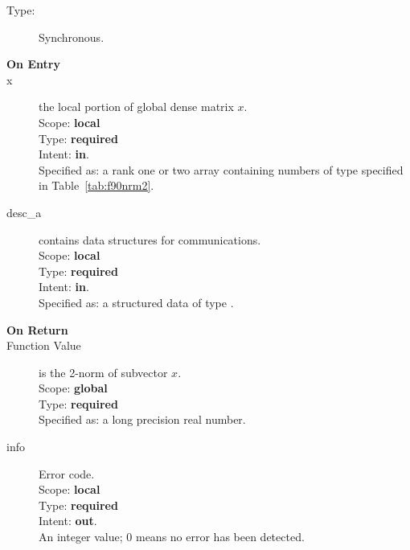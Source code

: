 \begin{description}
\item[Type:] Synchronous.
\item[\bf On Entry]
\item[x] the local portion of global dense matrix
$x$.%
\\
Scope: {\bf local} \\
Type: {\bf required} \\
Intent: {\bf in}.\\
Specified as:  a rank one or two array 
containing numbers of type specified in
Table~\ref{tab:f90nrm2}.
\item[desc\_a] contains data structures for communications.\\
Scope: {\bf local} \\
Type: {\bf required}\\
Intent: {\bf in}.\\
Specified as: a structured data of type \descdata.

\item[\bf On Return] 
\item[Function Value] is the 2-norm of subvector $x$.\\
Scope: {\bf global} \\
Type: {\bf required} \\
Specified as: a long precision real number.
\item[info] Error code.\\
Scope: {\bf local} \\
Type: {\bf required} \\
Intent: {\bf out}.\\
An integer value; 0 means no error has been detected. 
\end{description}




